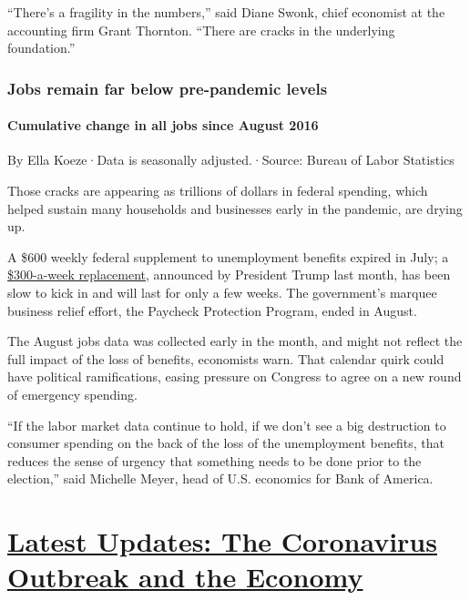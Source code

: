 ``There's a fragility in the numbers,'' said Diane Swonk, chief
economist at the accounting firm Grant Thornton. ``There are cracks in
the underlying foundation.''

\hypertarget{jobs-remain-far-below-pre-pandemic-levels}{%
\subsubsection{Jobs remain far below pre-pandemic
levels}\label{jobs-remain-far-below-pre-pandemic-levels}}

\hypertarget{cumulative-change-in-all-jobs-since-august-2016}{%
\paragraph{Cumulative change in all jobs since August
2016}\label{cumulative-change-in-all-jobs-since-august-2016}}

By Ella Koeze·Data is seasonally adjusted.·Source: Bureau of Labor
Statistics

Those cracks are appearing as trillions of dollars in federal spending,
which helped sustain many households and businesses early in the
pandemic, are drying up.

A \$600 weekly federal supplement to unemployment benefits expired in
July; a
\href{https://www.nytimes3xbfgragh.onion/article/stimulus-unemployment-payment-benefit.html?action=click\&module=RelatedLinks\&pgtype=Article}{\$300-a-week
replacement}, announced by President Trump last month, has been slow to
kick in and will last for only a few weeks. The government's marquee
business relief effort, the Paycheck Protection Program, ended in
August.

The August jobs data was collected early in the month, and might not
reflect the full impact of the loss of benefits, economists warn. That
calendar quirk could have political ramifications, easing pressure on
Congress to agree on a new round of emergency spending.

``If the labor market data continue to hold, if we don't see a big
destruction to consumer spending on the back of the loss of the
unemployment benefits, that reduces the sense of urgency that something
needs to be done prior to the election,'' said Michelle Meyer, head of
U.S. economics for Bank of America.

\hypertarget{latest-updates-the-coronavirus-outbreak-and-the-economy}{%
\section{\texorpdfstring{\href{https://www.nytimes3xbfgragh.onion/live/2020/09/11/business/stock-market-today-coronavirus?action=click\&pgtype=Article\&state=default\&region=MAIN_CONTENT_1\&context=storylines_live_updates}{Latest
Updates: The Coronavirus Outbreak and the
Economy}}{Latest Updates: The Coronavirus Outbreak and the Economy}}\label{latest-updates-the-coronavirus-outbreak-and-the-economy}}

